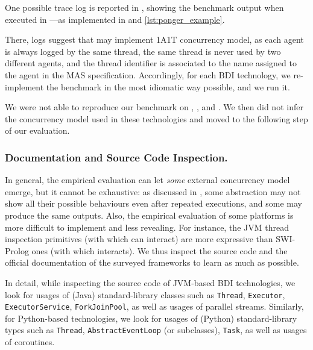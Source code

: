 One possible trace log is reported in , 
showing the benchmark output when executed in \jason{}%
---as implemented in  and \ref{lst:ponger_example}.
%

%
There, logs suggest that \jason{} may implement \ac{1A1T} concurrency model, as each agent is always logged by the same thread, the same thread is never used by two different agents, and the thread identifier is associated to the name assigned to the agent in the \ac{MAS} specification.
%
Accordingly, for each \ac{BDI} technology, we re-implement the benchmark in the most idiomatic way possible, and we run it.

We were not able to reproduce our benchmark on \jadex{}, \spadebdi{}, and \goal{}.
We then did not infer the concurrency model used in these technologies
and moved to the following step of our evaluation.

\subsubsection{Documentation and Source Code Inspection.}\label{par:inspection}

In general, the empirical evaluation can let \emph{some} external concurrency model emerge,
but it cannot be exhaustive:
as discussed in ,
some abstraction may not show all their possible behaviours even after repeated executions,
and some may produce the same outputs.
%
Also, 
the empirical evaluation of some platforms is more difficult to implement and less revealing.
%
For instance,
the \ac{JVM} thread inspection primitives  
(with which \jason{} can interact)
are more expressive than SWI-Prolog ones
(with which \goal{} interacts).
%
We thus inspect the source code and the official documentation of the surveyed frameworks
to learn as much as possible.

In detail, 
while inspecting the source code of \ac{JVM}-based \ac{BDI} technologies, 
we look for usages of (Java) standard-library classes such as \texttt{Thread}, \texttt{Executor}, \texttt{ExecutorService}, \texttt{ForkJoinPool}, 
as well as usages of parallel streams.
%
Similarly,
for Python-based technologies, 
we look for usages of (Python) standard-library types such as \texttt{Thread}, \texttt{Abstract\-EventLoop} (or subclasses), \texttt{Task}, 
as well as usages of coroutines.


